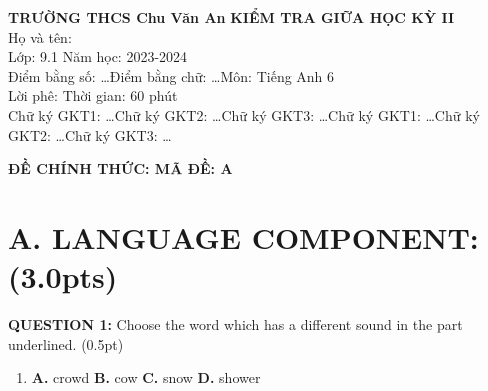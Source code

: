 \documentclass[a4paper,12pt]{article}
\begin{document}
\begin{center}
      \textbf{TRƯỜNG THCS Chu Văn An} \hfill \textbf{KIỂM TRA GIỮA HỌC KỲ II} \\
      Họ và tên: \dotfill \\
      Lớp: 9.1 \hfill Năm học: 2023-2024 \\
      Điểm bằng số: \ldots \quad Điểm bằng chữ: \ldots \hfill Môn: Tiếng Anh 6 \\
      Lời phê: \dotfill \hfill Thời gian: 60 phút \\
      Chữ ký GKT1: \ldots \quad Chữ ký GKT2: \ldots \quad Chữ ký GKT3: \ldots \hfill Chữ ký GKT1: \ldots \quad Chữ ký GKT2: \ldots \quad Chữ ký GKT3: \ldots
\end{center}

\vspace{0.5cm}

\begin{center}
      \textbf{ĐỀ CHÍNH THỨC: MÃ ĐỀ: A}
\end{center}

\vspace{0.5cm}

\section*{A. LANGUAGE COMPONENT: (3.0pts)}

\textbf{QUESTION 1:} Choose the word which has a different sound in the part underlined. (0.5pt) \\
\begin{enumerate}[label=\arabic*.]
      \item \textbf{A.} crowd \quad \textbf{B.} cow \quad \textbf{C.} snow \quad \textbf{D.} shower
\end{enumerate}
\end{document}
